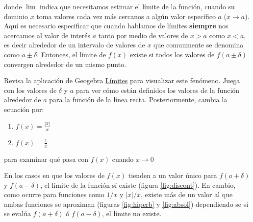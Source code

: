 \documentclass[
]{book}
\providecommand{\tightlist}{%
  \setlength{\itemsep}{0pt}\setlength{\parskip}{0pt}}
\begin{document}
donde \(\lim\) indica que necesitamos estimar el límite de la función, cuando su dominio \(x\) toma valores cada vez más cercanos a algún valor específico \(a\) (\(x \rightarrow a\)). Aquí es necesario especificar que cuando hablamos de límites \textbf{siempre} nos acercamos al valor de interés \(a\) tanto por medio de valores de \(x>a\) como \(x<a\), es decir alrededor de un intervalo de valores de \(x\) que comunmente se denomina como \(a \pm \delta\). Entonces, el límite de \(f(x)\) existe si todos los valores de \(f(a \pm \delta)\) convergen alrededor de un mismo punto.

Revisa la aplicación de Geogebra \href{https://www.geogebra.org/classic/b76f7gpx}{Límites} para visualizar este fenómeno. Juega con los valores de \(\delta\) y \(a\) para ver cómo están definidos los valores de la función alrededor de \(a\) para la función de la línea recta. Posteriormente, cambia la ecuación por:

\begin{enumerate}
\def\labelenumi{\arabic{enumi}.}
\tightlist
\item
  \(f(x) = \frac{|x|}{x}\)
\item
  \(f(x)= \frac{1}{x}\)
\end{enumerate}

para examinar qué pasa con \(f(x)\) cuando \(x \rightarrow 0\)

En los casos en que los valores de \(f(x)\) tienden a un valor único para \(f(a + \delta)\) y \(f(a - \delta)\), el límite de la función sí existe (figura \ref{fig:discont}). En cambio, como ocurre para funciones como \(1/x\) y \(|x|/x\), existe más de un valor al que ambas funciones se aproximan (figuras \ref{fig:hiperb} y \ref{fig:absol}) dependiendo se si se evalúa \(f(a + \delta)\) ó \(f(a - \delta)\), el límite no existe.
\end{document}
